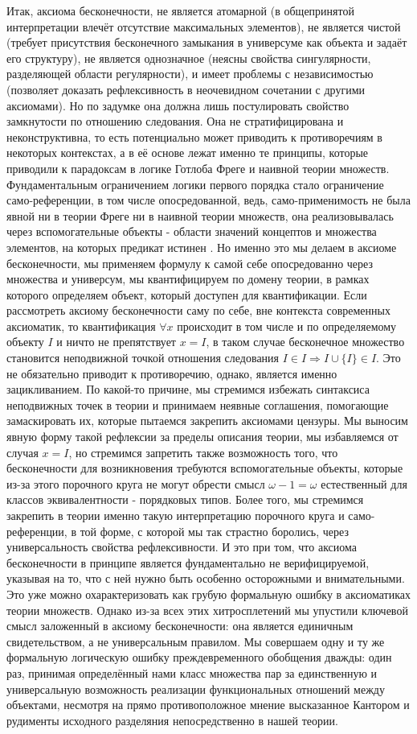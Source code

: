 \documentclass[12pt]{article}
\begin{document}
Итак, аксиома бесконечности, не является атомарной (в общепринятой интерпретации влечёт отсутствие максимальных элементов), не является чистой (требует присутствия бесконечного замыкания в универсуме как объекта и задаёт его структуру), не является однозначное (неясны свойства сингулярности, разделяющей области регулярности), и имеет проблемы с независимостью (позволяет доказать рефлексивность в неочевидном сочетании с другими аксиомами). Но по задумке она должна лишь постулировать свойство замкнутости по отношению следования. Она не стратифицирована и неконструктивна, то есть потенциально может приводить к противоречиям в некоторых контекстах, а в её основе лежат именно те принципы, которые приводили к парадоксам в логике Готлоба Фреге и наивной теории множеств. Фундаментальным ограничением логики первого порядка стало ограничение само-референции, в том числе опосредованной, ведь, само-применимость не была явной ни в теории Фреге ни в наивной теории множеств, она реализовывалась через вспомогательные объекты - области значений концептов и множества элементов, на которых предикат истинен \cite{frege-logic}. Но именно это мы делаем в аксиоме бесконечности, мы применяем формулу к самой себе опосредованно через множества и универсум, мы квантифицируем по домену теории, в рамках которого определяем объект, который доступен для квантификации. Если рассмотреть аксиому бесконечности саму по себе, вне контекста современных аксиоматик, то квантификация $\forall x$ происходит в том числе и по определяемому объекту $I$ и ничто не препятствует $x = I$, в таком случае бесконечное множество становится неподвижной точкой отношения следования $I \in I \Rightarrow I \cup \{ I \} \in I$. Это не обязательно приводит к противоречию, однако, является именно зацикливанием. По какой-то причине, мы стремимся избежать синтаксиса неподвижных точек в теории и принимаем неявные соглашения, помогающие замаскировать их, которые пытаемся закрепить аксиомами цензуры. Мы выносим явную форму такой рефлексии за пределы описания теории, мы избавляемся от случая $x = I$, но стремимся запретить также возможность того, что бесконечности для возникновения требуются вспомогательные объекты, которые из-за этого порочного круга не могут обрести смысл $\omega - 1 = \omega$ естественный для классов эквивалентности - порядковых типов. Более того, мы стремимся закрепить в теории именно такую интерпретацию порочного круга и само-референции, в той форме, с которой мы так страстно боролись, через универсальность свойства рефлексивности. И это при том, что аксиома бесконечности в принципе является фундаментально не верифицируемой, указывая на то, что с ней нужно быть особенно осторожными и внимательными. Это уже можно охарактеризовать как грубую формальную ошибку в аксиоматиках теории множеств. Однако из-за всех этих хитросплетений мы упустили ключевой смысл заложенный в аксиому бесконечности: она является единичным свидетельством, а не универсальным правилом. Мы совершаем одну и ту же формальную логическую ошибку преждевременного обобщения дважды: один раз, принимая определённый нами класс множества пар за единственную и универсальную возможность реализации функциональных отношений между объектами, несмотря на прямо противоположное мнение высказанное Кантором и рудименты исходного разделяния непосредственно в нашей теории. 
\end{document}
